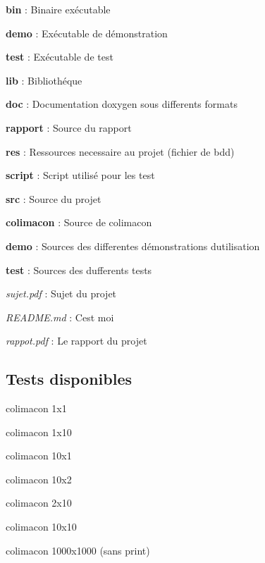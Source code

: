 \begin{DoxyItemize}
\item {\bfseries bin} \+: Binaire exécutable
\begin{DoxyItemize}
\item {\bfseries demo} \+: Exécutable de démonstration
\item {\bfseries test} \+: Exécutable de test
\end{DoxyItemize}
\item {\bfseries lib} \+: Bibliothéque
\item {\bfseries doc} \+: Documentation doxygen sous differents formats
\item {\bfseries rapport} \+: Source du rapport
\item {\bfseries res} \+: Ressources necessaire au projet (fichier de bdd)
\item {\bfseries script} \+: Script utilisé pour les test
\item {\bfseries src} \+: Source du projet
\begin{DoxyItemize}
\item {\bfseries colimacon} \+: Source de colimacon
\item {\bfseries demo} \+: Sources des differentes démonstrations d\textquotesingle{}utilisation
\item {\bfseries test} \+: Sources des dufferents tests
\end{DoxyItemize}
\item {\itshape sujet.\+pdf} \+: Sujet du projet
\item {\itshape R\+E\+A\+D\+M\+E.\+md} \+: C\textquotesingle{}est moi
\item {\itshape rappot.\+pdf} \+: Le rapport du projet
\end{DoxyItemize}

\subsection*{Tests disponibles}


\begin{DoxyItemize}
\item colimacon 1x1
\item colimacon 1x10
\item colimacon 10x1
\item colimacon 10x2
\item colimacon 2x10
\item colimacon 10x10
\item colimacon 1000x1000 (sans print) 
\end{DoxyItemize}